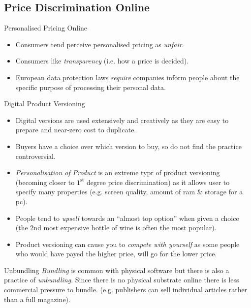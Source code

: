 \documentclass[11pt,a4paper]{article}
\begin{document}
\subsection{Price Discrimination Online}

\begin{remark}{Personalised Pricing Online}
  \begin{itemize}
    \item Consumers tend perceive personalised pricing as \textit{unfair}.
    \item Consumers like \textit{transparency} (i.e. how a price is decided).
    \item European data protection laws \textit{require} companies inform people about the specific purpose of processing their personal data.
  \end{itemize}
\end{remark}

\begin{proposition}{Digital Product Versioning}
  \begin{itemize}
    \item Digital versions are used extensively and creatively as they are easy to prepare and near-zero cost to duplicate.
    \item Buyers have a choice over which version to buy, so do not find the practice controversial.
    \item \textit{Personalisation of Product} is an extreme typr of product versioning (becoming closer to $1^\text{st}$ degree price discrimination) as it allows user to specify many properties (e.g. screen quality, amount of ram \& storage for a pc).
    \item People tend to \textit{upsell} towards an ``almost top option'' when given a choice (the 2nd most expensive bottle of wine is often the most popular).
    \item Product versioning can cause you to \textit{compete with yourself} as some people who would have payed the higher price, will go for the lower price.
  \end{itemize}
\end{proposition}

\begin{remark}{Unbundling}
  \textit{Bundling} is common with physical software but there is also a practice of \textit{unbundling}. Since there is no physical substrate online there is less commercial pressure to bundle. (e.g. publishers can sell individual articles rather than a full magazine).
\end{remark}
\end{document}
